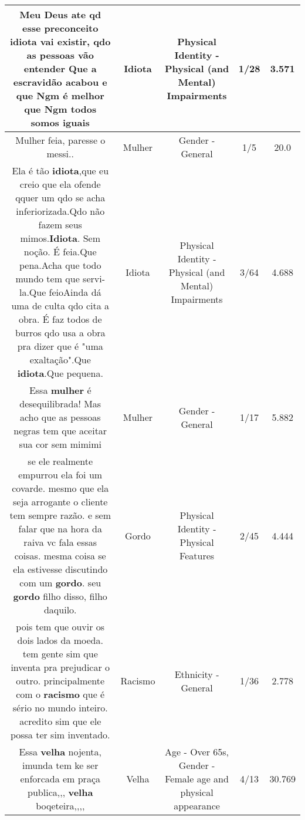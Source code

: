 \documentclass[11pt]{article}
\newlength\mylength
\begin{document}
\begin{center}
\begin{longtable}{|C{.65\mylength}|C{.30\mylength}|C{.12\mylength}|C{.12\mylength}|C{.12\mylength}|}
  \small Meu Deus ate qd esse preconceito \textbf{idiota} vai existir, qdo  as pessoas vão entender Que a escravidão acabou e que Ngm é melhor que Ngm todos somos iguais\normalsize   & Idiota & Physical Identity - Physical (and Mental) Impairments & 1/28 & 3.571 \\  \hline
  \small Mulher feia, paresse o messi..\normalsize   & Mulher & Gender - General & 1/5 & 20.0 \\  \hline
  \small Ela é tão \textbf{idiota},que eu creio que ela ofende qquer um qdo se acha inferiorizada.Qdo não fazem seus mimos.\textbf{Idiota}. Sem noção. É feia.Que pena.Acha que todo mundo tem que servi-la.Que feioAinda dá uma de culta qdo cita a obra. É faz todos de burros qdo usa a obra pra dizer que é "uma exaltação".Que \textbf{idiota}.Que pequena.\normalsize   & Idiota & Physical Identity - Physical (and Mental) Impairments & 3/64 & 4.688 \\  \hline
  \small Essa \textbf{mulher} é desequilibrada! Mas acho que as pessoas negras tem que aceitar sua cor sem mimimi\normalsize   & Mulher & Gender - General & 1/17 & 5.882 \\  \hline
  \small se ele realmente empurrou ela foi um covarde. mesmo que ela seja arrogante o cliente tem sempre razão. e sem falar que na hora da raiva vc fala essas coisas. mesma coisa se ela estivesse discutindo com um \textbf{gordo}. seu \textbf{gordo} filho disso, filho daquilo.\normalsize   & Gordo & Physical Identity - Physical Features & 2/45 & 4.444 \\  \hline
  \small pois tem que ouvir os dois lados da moeda. tem gente sim que inventa pra prejudicar o outro. principalmente com o \textbf{racismo} que é sério no mundo inteiro. acredito sim que ele possa ter sim inventado.\normalsize   & Racismo & Ethnicity - General & 1/36 & 2.778 \\  \hline
  \small Essa \textbf{v\textbf{elha}} nojenta, imunda tem ke ser enforcada em praça publica,,, \textbf{v\textbf{elha}} boqeteira,,,,\normalsize   & Velha & Age - Over 65s, Gender - Female age and physical appearance & 4/13 & 30.769 \\  \hline

\end{longtable}
\end{center}
\end{document}
